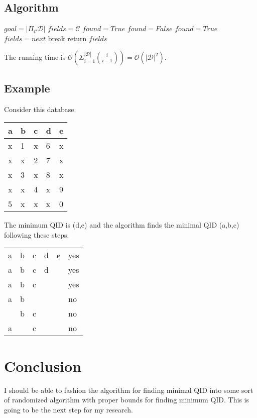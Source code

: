 \documentclass[12pt]{llncs}
\newcommand{\cD}{\mathcal{D}}
\begin{document}
\subsection{Algorithm}
\begin{algorithm}[H]
    \DontPrintSemicolon
    \KwData{A database $\cD$.}
    $goal = |\Pi_{\mathcal{C}} \mathcal{D}|$\;
    $fields = \mathcal{C}$\;
    $found = True$\;
    {
        $found = False$\;
        {
            {
                $found = True$\;
                $fields = next$\;
                break\;
            }
        }
    }
    return $fields$\;
\end{algorithm}

The running time is $\mathcal{O}(\Sigma_{i=1}^{|\mathcal{D}|} \binom{i}{i-1}) = \mathcal{O}(|\mathcal{D}|^2)$.

\subsection{Example}
Consider this database.
\begin{center}
    \begin{tabular}{ | M{3em} | M{3em} | M{3em} | M{3em} | M{3em} | }
    \hline
    a & b & c & d & e\\
    \hline
    x & 1 & x & 6 & x\\
    x & x & 2 & 7 & x\\
    x & 3 & x & 8 & x\\
    x & x & 4 & x & 9\\
    5 & x & x & x & 0\\
    \hline
    \end{tabular}
\end{center}

The minimum QID is (d,e) and the algorithm finds the minimal QID (a,b,c) following these steps.
\begin{center}
    \begin{tabular}{ | M{3em} | M{3em} | M{3em} | M{3em} | M{3em} | M{3em} | }
    \hline
    a & b & c & d & e & yes\\
    a & b & c & d &   & yes\\
    a & b & c &   &   & yes\\
    a & b &   &   &   & no\\
      & b & c &   &   & no\\
    a &   & c &   &   & no\\
    \hline
    \end{tabular}
\end{center}

\section{Conclusion}
I should be able to fashion the algorithm for finding minimal QID into some sort of randomized algorithm with proper bounds for finding minimum QID. This is going to be the next step for my research.



\end{document}
